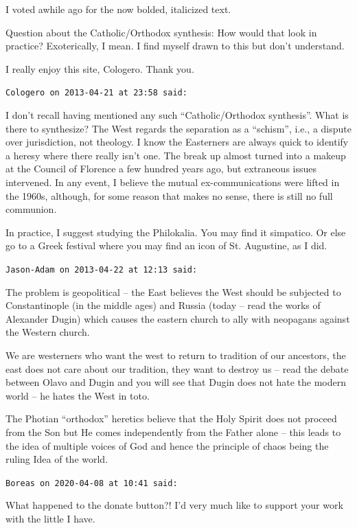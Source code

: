 \begin{footnotesize}
\begin{sffamily}
I voted awhile ago for the now bolded, italicized text.

Question about the Catholic/Orthodox synthesis: How would that look in practice? Exoterically, I mean. I find myself drawn to this but don't understand.

I really enjoy this site, Cologero. Thank you.

\hfill

\texttt{Cologero on 2013-04-21 at 23:58 said:}

I don't recall having mentioned any such ``Catholic/Orthodox synthesis''. What is there to synthesize? The West regards the separation as a ``schism'', i.e., a dispute over jurisdiction, not theology. I know the Easterners are always quick to identify a heresy where there really isn't one. The break up almost turned into a makeup at the Council of Florence a few hundred years ago, but extraneous issues intervened. In any event, I believe the mutual ex-communications were lifted in the 1960s, although, for some reason that makes no sense, there is still no full communion.

In practice, I suggest studying the Philokalia. You may find it simpatico. Or else go to a Greek festival where you may find an icon of St. Augustine, as I did.

\hfill

\texttt{Jason-Adam on 2013-04-22 at 12:13 said:}

The problem is geopolitical -- the East believes the West should be subjected to Constantinople (in the middle ages) and Russia (today -- read the works of Alexander Dugin) which causes the eastern church to ally with neopagans against the Western church.

We are westerners who want the west to return to tradition of our ancestors, the east does not care about our tradition, they want to destroy us -- read the debate between Olavo and Dugin and you will see that Dugin does not hate the modern world -- he hates the West in toto.

The Photian ``orthodox'' heretics believe that the Holy Spirit does not proceed from the Son but He comes independently from the Father alone -- this leads to the idea of multiple voices of God and hence the principle of chaos being the ruling Idea of the world.

\hfill

\texttt{Boreas on 2020-04-08 at 10:41 said:}

What happened to the donate button?! I'd very much like to support your work with the little I have.


\end{sffamily}
\end{footnotesize}
